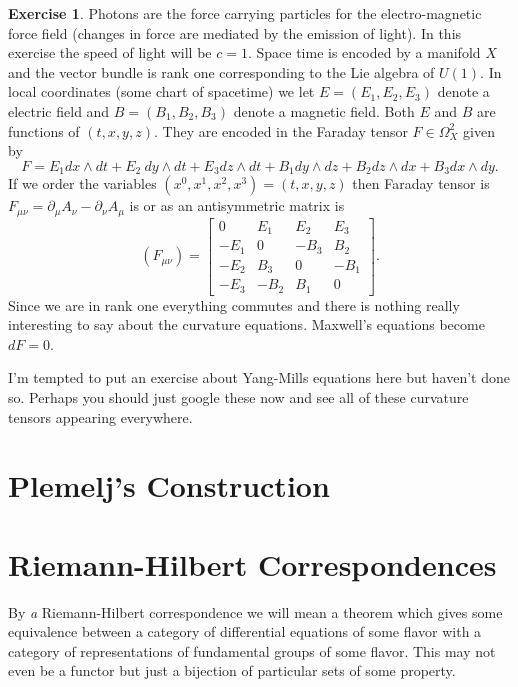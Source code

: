 \documentclass[12pt]{book}
\numberwithin{equation}{section}
\theoremstyle{definition}
\newtheorem{exercise}[theorem]{Exercise}
\theoremstyle{remark}
\begin{document}
\begin{exercise}
	Photons are the force carrying particles for the electro-magnetic force field (changes in force are mediated by the emission of light). 
	In this exercise the speed of light will be $c=1$.
	Space time is encoded by a manifold $X$ and the vector bundle is rank one corresponding to the Lie algebra of $U(1)$. 
	In local coordinates (some chart of spacetime) we let $E=(E_1,E_2,E_3)$ denote a electric field and $B=(B_1,B_2,B_3)$ denote a magnetic field. 
	Both $E$ and $B$ are functions of $(t,x,y,z)$.
	They are encoded in the Faraday tensor $F\in \Omega^2_X$ given by 
	$$F= E_1dx \wedge dt + E_2\ dy \wedge dt + E_3 dz \wedge dt + B_1 dy \wedge dz + B_2 dz \wedge dx + B_3 dx \wedge dy.$$
	If we order the variables $(x^0,x^1,x^2,x^3)=(t,x,y,z)$ then Faraday tensor is $F_{\mu\nu} = \partial_{\mu}A_{\nu}-\partial_{\nu}A_{\mu}$ is  or as an antisymmetric matrix is
	$$(F_{\mu\nu})=\begin{bmatrix}
	0     &  E_1 &  E_2 &  E_3 \\
	-E_1 &  0     & -B_3   &  B_2    \\
	-E_2 &  B_3  &  0     & -B_1  \\
	-E_3 & -B_2   &  B_1  &  0
	\end{bmatrix}.$$
	Since we are in rank one everything commutes and there is nothing really interesting to say about the curvature equations. 
	Maxwell's equations become $dF=0$.
\end{exercise}

I'm tempted to put an exercise about Yang-Mills equations here but haven't done so. 
Perhaps you should just google these now and see all of these curvature tensors appearing everywhere.

\section{Plemelj's Construction}

\section{Riemann-Hilbert Correspondences}\label{S:rhcs}
By \emph{a} Riemann-Hilbert correspondence we will mean a theorem which gives some equivalence between a category of differential equations of some flavor with a category of representations of fundamental groups of some flavor. 
This may not even be a functor but just a bijection of particular sets of some property. 
\end{document}
